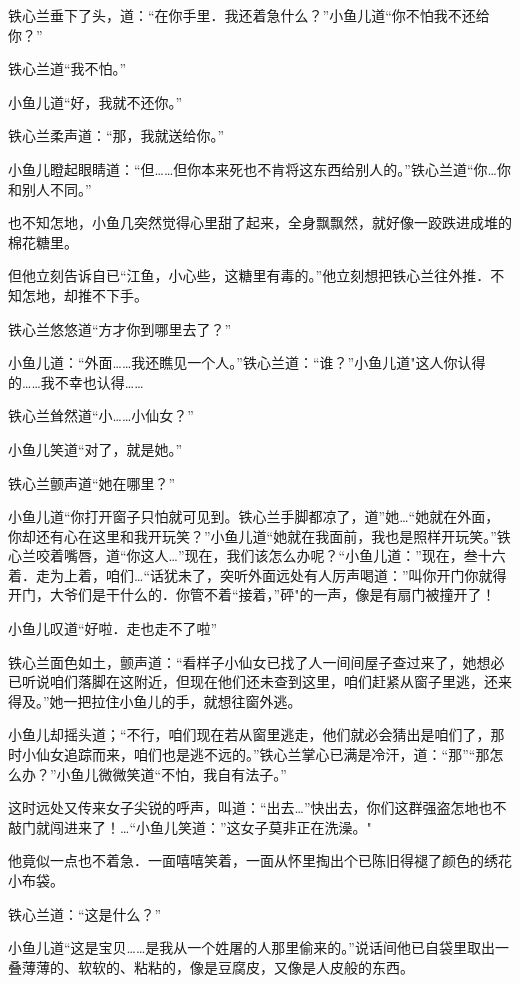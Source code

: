 \documentclass[12pt,oneside]{book}
\begin{document}
铁心兰垂下了头，道：``在你手里．我还着急什么？''小鱼儿道``你不怕我不还给你？''

铁心兰道``我不怕。''

小鱼儿道``好，我就不还你。''

铁心兰柔声道：``那，我就送给你。''

小鱼儿瞪起眼睛道：``但\ldots\ldots 但你本来死也不肯将这东西给别人的。''铁心兰道``你\ldots 你和别人不同。''

也不知怎地，小鱼几突然觉得心里甜了起来，全身飘飘然，就好像一跤跌进成堆的棉花糖里。

但他立刻告诉自已``江鱼，小心些，这糖里有毒的。''他立刻想把铁心兰往外推．不知怎地，却推不下手。

铁心兰悠悠道``方才你到哪里去了？''

小鱼儿道：``外面\ldots\ldots 我还瞧见一个人。''铁心兰道：``谁？''小鱼儿道"这人你认得的\ldots\ldots 我不幸也认得\ldots\ldots{}

铁心兰耸然道``小\ldots\ldots 小仙女？''

小鱼儿笑道``对了，就是她。''

铁心兰颤声道``她在哪里？''

小鱼儿道``你打开窗子只怕就可见到。铁心兰手脚都凉了，道''她\ldots{}``她就在外面，你却还有心在这里和我开玩笑？''小鱼儿道``她就在我面前，我也是照样开玩笑。''铁心兰咬着嘴唇，道``你这人\ldots{}''现在，我们该怎么办呢？``小鱼儿道：''现在，叁十六着．走为上着，咱们\ldots{}``话犹未了，突听外面远处有人厉声喝道：''叫你开门你就得开门，大爷们是干什么的．你管不着``接着，''砰"的一声，像是有扇门被撞开了！

小鱼儿叹道``好啦．走也走不了啦''

铁心兰面色如土，颤声道：``看样子小仙女已找了人一间间屋子查过来了，她想必已听说咱们落脚在这附近，但现在他们还未查到这里，咱们赶紧从窗子里逃，还来得及。''她一把拉住小鱼儿的手，就想往窗外逃。

小鱼儿却摇头道；``不行，咱们现在若从窗里逃走，他们就必会猜出是咱们了，那时小仙女追踪而来，咱们也是逃不远的。''铁心兰掌心已满是冷汗，道：``那''``那怎么办？''小鱼儿微微笑道``不怕，我自有法子。''

这时远处又传来女子尖锐的呼声，叫道：``出去\ldots{}''快出去，你们这群强盗怎地也不敲门就闯进来了！\ldots{}``小鱼儿笑道：''这女子莫非正在洗澡。"

他竟似一点也不着急．一面嘻嘻笑着，一面从怀里掏出个已陈旧得褪了颜色的绣花小布袋。

铁心兰道：``这是什么？''

小鱼儿道``这是宝贝\ldots\ldots 是我从一个姓屠的人那里偷来的。''说话间他已自袋里取出一叠薄薄的、软软的、粘粘的，像是豆腐皮，又像是人皮般的东西。
\end{document}
